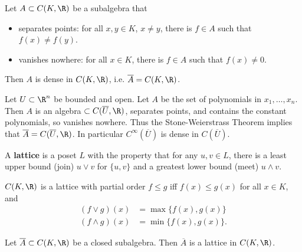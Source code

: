 \documentclass{article}
\begin{document}
\begin{thm}
    Let $A \subset C(K, \R)$ be a subalgebra that
    \begin{itemize}
        \item separates points: for all $x, y \in K$, $x \neq y$, there is $f \in A$ such that $f(x) \neq f(y)$.
        \item vanishes nowhere: for all $x \in K$, there is $f \in A$ such that $f(x) \neq 0$.
    \end{itemize}
    Then $A$ is dense in $C(K, \R)$, i.e. $\overline{A} = C(K, \R)$.
\end{thm}

\begin{eg}
    Let $U \subset \R^n$ be bounded and open.
    Let $A$ be the set of polynomials in $x_1, \dotsc, x_n$.
    Then $A$ is an algebra $\subset C(\overline{U}, \R)$, separates points, and contains the constant polynomials, so vanishes nowhere.
    Thus the Stone-Weierstrass Theorem implies that $\overline{A} = C(\overline{U}, \R)$.
    In particular $C^\infty(\overline{U})$ is dense in $C(\overline{U})$.
\end{eg}

\begin{defi}
    A \textbf{lattice} is a poset $L$ with the property that for any $u, v \in L$, there is a least upper bound (join) $u \vee v$ for $\{u, v\}$ and a greatest lower bound (meet) $u \wedge v$.
\end{defi}

\begin{eg}
    $C(K, \R)$ is a lattice with partial order $f \leq g$ iff $f(x) \leq g(x)$ for all $x \in K$, and
    \begin{align*}
        (f \vee g)(x) &= \max\{f(x), g(x)\} \\
        (f \wedge g)(x) &= \min\{f(x), g(x)\}.
    \end{align*}
\end{eg}

\begin{lemma}
    Let $\overline{A} \subset C(K, \R)$ be a closed subalgebra.
    Then $\overline{A}$ is a lattice in $C(K, \R)$.
\end{lemma}
\end{document}
